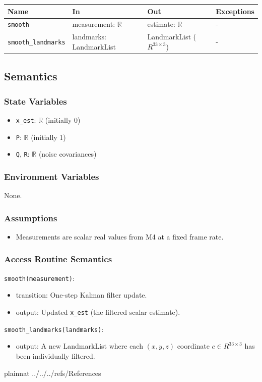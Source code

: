\documentclass[12pt, titlepage]{article}
\begin{document}
\begin{center}
\begin{tabular}{p{3.5cm} p{4.5cm} p{3.5cm} p{2cm}}
\hline
\textbf{Name} & \textbf{In} & \textbf{Out} & \textbf{Exceptions} \\
\hline
\texttt{smooth} & measurement: $\mathbb{R}$ & estimate: $\mathbb{R}$ & - \\
\texttt{smooth\_landmarks} & landmarks: LandmarkList & LandmarkList ($R^{33 \times 3}$) & - \\
\hline
\end{tabular}
\end{center}

\subsection{Semantics}

\subsubsection{State Variables}
\begin{itemize}
  \item \texttt{x\_est}: $\mathbb{R}$ (initially 0)
  \item \texttt{P}: $\mathbb{R}$ (initially 1)
  \item \texttt{Q}, \texttt{R}: $\mathbb{R}$ (noise covariances)
\end{itemize}

\subsubsection{Environment Variables}
None.

\subsubsection{Assumptions}
\begin{itemize}
  \item Measurements are scalar real values from M4 at a fixed frame rate.
\end{itemize}

\subsubsection{Access Routine Semantics}

\noindent \texttt{smooth(measurement)}:
\begin{itemize}
  \item transition: One-step Kalman filter update.
  \item output: Updated \texttt{x\_est} (the filtered scalar estimate).
\end{itemize}

\noindent \texttt{smooth\_landmarks(landmarks)}:
\begin{itemize}
  \item output: A new LandmarkList where each $(x, y, z)$ coordinate $c \in R^{33 \times 3}$ has been individually filtered.
\end{itemize}

\newpage

 {plainnat}
 {../../../refs/References}
\end{document}

